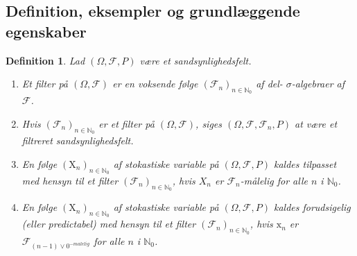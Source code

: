 \documentclass{article}
\newcommand{\1}{\mathbbm{1}}
\theoremstyle{boxed}
\newtheorem{definition}[theorem]{Definition}
\begin{document}
\subsection{Definition, eksempler og grundlæggende egenskaber}
\begin{theorem-box}
    \begin{definition}
        Lad $(\Omega, \mathcal{F}, P)$ være et sandsynlighedsfelt.
        \begin{enumerate}
            \item Et filter på $(\Omega, \mathcal{F})$ er en voksende følge $\left(\mathcal{F}_n\right)_{n \in \mathbb{N}_0}$ af del- $\sigma$-algebraer af $\mathcal{F}$.
            \item Hvis $\left(\mathcal{F}_n\right)_{n \in \mathbb{N}_0}$ er et filter på $(\Omega, \mathcal{F})$, siges $\left(\Omega, \mathcal{F}, \mathcal{F}_n, P\right)$ at være et filtreret sandsynlighedsfelt.
            \item En følge $\left(\mathrm{X}_n\right)_{n \in \mathbb{N}_0}$ af stokastiske variable på $(\Omega, \mathcal{F}, P)$ kaldes tilpasset med hensyn til et filter $\left(\mathcal{F}_n\right)_{n \in \mathbb{N}_0}$, hvis $X_n$ er $\mathcal{F}_n$-målelig for alle $n$ i $\mathbb{N}_0$.
            \item En følge $\left(\mathrm{X}_n\right)_{n \in \mathbb{N}_0}$ af stokastiske variable på $(\Omega, \mathcal{F}, P)$ kaldes forudsigelig (eller predictabel) med hensyn til et filter $\left(\mathcal{F}_n\right)_{n \in \mathbb{N}_0}$, hvis $\mathrm{x}_n$ er $\mathcal{F}_{(n-1) \vee 0^{-m a l e l i g}}$ for alle $n$ i $\mathbb{N}_0$.
        \end{enumerate}
    \end{definition}
\end{theorem-box}
\end{document}
